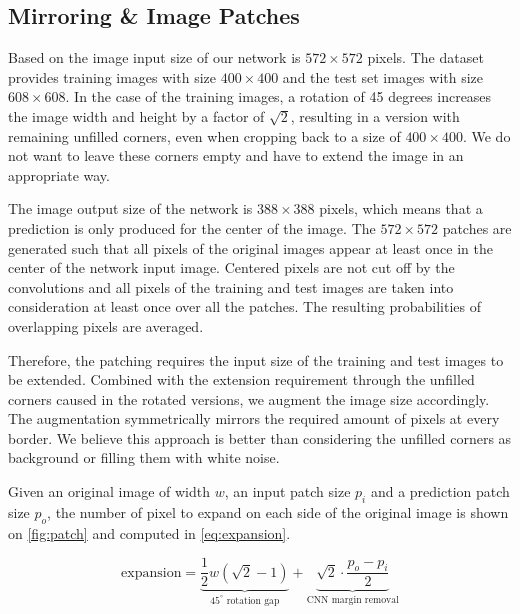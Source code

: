 \documentclass[10pt,conference,compsocconf]{IEEEtran}
\begin{document}
\subsection{Mirroring \& Image Patches}
Based on \citep{unet} the image input size of our network is $572\times572$ pixels. The dataset provides training images with size $400\times400$ and the test set images with size $608\times608$. In the case of the training images, a rotation of 45 degrees increases the image width and height by a factor of $\sqrt{2}$, resulting in a version with remaining unfilled corners, even when cropping back to a size of $400\times400$. We do not want to leave these corners empty and have to extend the image in an appropriate way.

The image output size of the network is $388\times388$ pixels, which means that a prediction is only produced for the center of the image. The $572\times572$ patches are generated such that all pixels of the original images appear at least once in the center of the network input image. Centered pixels are not cut off by the convolutions and all pixels of the training and test images are taken into consideration at least once over all the patches. The resulting probabilities of overlapping pixels are averaged.

Therefore, the patching requires the input size of the training and test images to be extended. Combined with the extension requirement through the unfilled corners caused in the rotated versions, we augment the image size accordingly. The augmentation symmetrically mirrors the required amount of pixels at every border. We believe this approach is better than considering the unfilled corners as background or filling them with white noise.

Given an original image of width $w$, an input patch size $p_i$ and a prediction patch size $p_o$, the number of pixel to expand on each side of the original image is shown on \cref{fig:patch} and computed in \cref{eq:expansion}.

\begin{equation}
  \text{expansion} = \underbrace{\frac 1 2 w(\sqrt 2 - 1)}_{45^\circ \text{ rotation gap}} + \underbrace{\sqrt 2 \cdot \frac{p_o - p_i} 2}_{\text{CNN margin removal}}
  \label{eq:expansion}
\end{equation}
\end{document}
